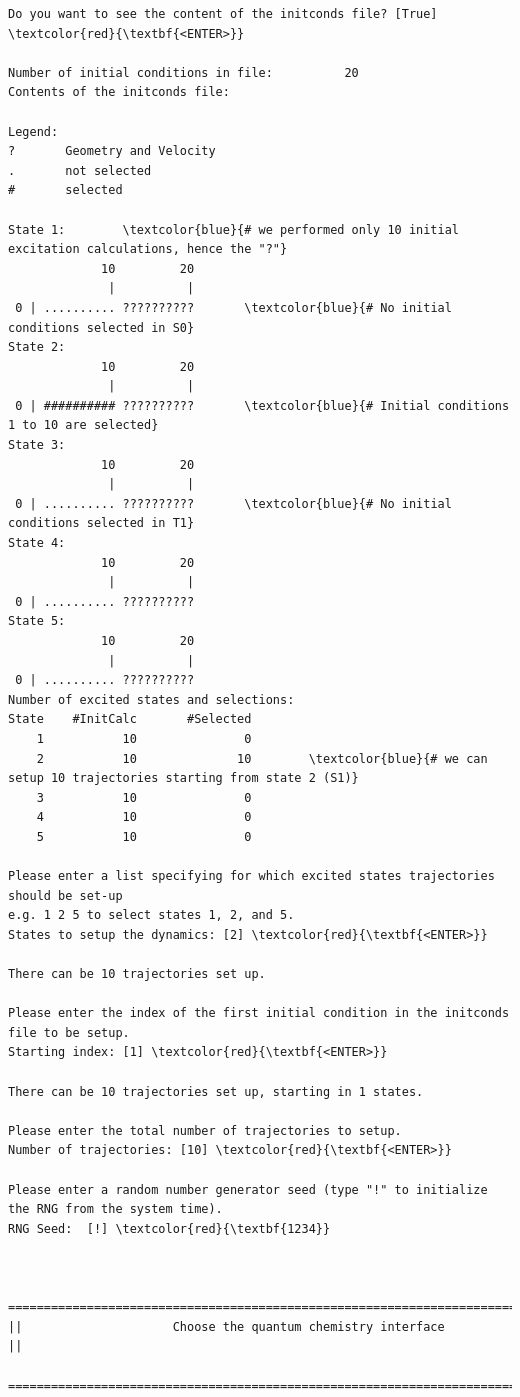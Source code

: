 \documentclass[a4paper,11pt,DIV=15,openany]{scrbook}
\begin{document}
\begin{oframed}
\begin{Verbatim}[commandchars=\\\{\}]
Do you want to see the content of the initconds file? [True] \textcolor{red}{\textbf{<ENTER>}}

Number of initial conditions in file:          20
Contents of the initconds file:

Legend:
?       Geometry and Velocity
.       not selected
#       selected

State 1:        \textcolor{blue}{# we performed only 10 initial excitation calculations, hence the "?"}
             10         20
              |          |
 0 | .......... ??????????       \textcolor{blue}{# No initial conditions selected in S0}
State 2:
             10         20
              |          |
 0 | ########## ??????????       \textcolor{blue}{# Initial conditions 1 to 10 are selected}
State 3:
             10         20
              |          |
 0 | .......... ??????????       \textcolor{blue}{# No initial conditions selected in T1}
State 4:
             10         20
              |          |
 0 | .......... ??????????
State 5:
             10         20
              |          |
 0 | .......... ??????????
Number of excited states and selections:
State    #InitCalc       #Selected
    1           10               0
    2           10              10        \textcolor{blue}{# we can setup 10 trajectories starting from state 2 (S1)}
    3           10               0
    4           10               0
    5           10               0

Please enter a list specifying for which excited states trajectories should be set-up
e.g. 1 2 5 to select states 1, 2, and 5.
States to setup the dynamics: [2] \textcolor{red}{\textbf{<ENTER>}}

There can be 10 trajectories set up.

Please enter the index of the first initial condition in the initconds file to be setup.
Starting index: [1] \textcolor{red}{\textbf{<ENTER>}}

There can be 10 trajectories set up, starting in 1 states.

Please enter the total number of trajectories to setup.
Number of trajectories: [10] \textcolor{red}{\textbf{<ENTER>}}

Please enter a random number generator seed (type "!" to initialize the RNG from the system time).
RNG Seed:  [!] \textcolor{red}{\textbf{1234}}


  ================================================================================
||                     Choose the quantum chemistry interface                     ||
  ================================================================================



\end{Verbatim}
\end{oframed}
\end{document}
